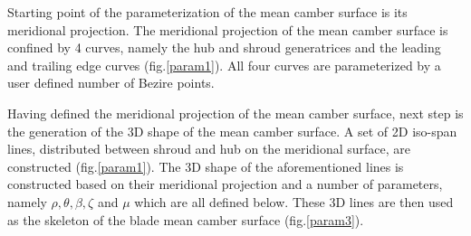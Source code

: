 Starting point of the parameterization of the mean camber surface is its meridional projection. The meridional projection of the mean camber surface is confined by 4 curves, namely the hub and shroud generatrices and the leading and trailing edge curves (fig.\ref{param1}). All four curves are parameterized by a user defined number of Bezire points.



Having defined the meridional projection of the mean camber surface, next step is the generation of the 3D shape of the mean camber surface. A set of 2D iso-span lines, distributed between shroud and hub on the meridional surface, are constructed (fig.\ref{param1}). The 3D shape of the aforementioned lines is constructed based on their meridional projection and a number of parameters, namely $\rho,\theta,\beta,\zeta$ and $\mu$ which are all defined below. These 3D lines are then used as the skeleton of the blade mean camber surface (fig.\ref{param3}).

